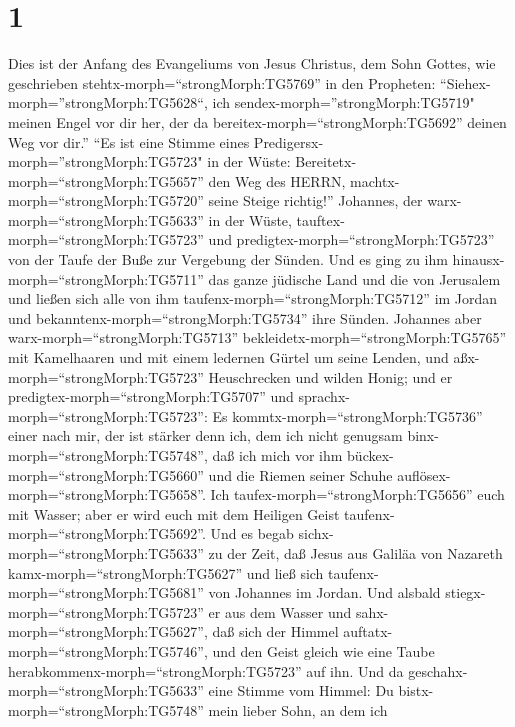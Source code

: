 \hypertarget{section}{%
\section{1}\label{section}}

 Dies ist der Anfang des Evangeliums von Jesus Christus, dem
Sohn Gottes,  wie geschrieben
stehtx-morph=``strongMorph:TG5769'' in den Propheten:
``Siehex-morph=''strongMorph:TG5628``, ich
sendex-morph=''strongMorph:TG5719" meinen Engel vor dir her, der da
bereitex-morph=``strongMorph:TG5692'' deinen Weg vor dir.'' 
``Es ist eine Stimme eines Predigersx-morph=''strongMorph:TG5723" in der
Wüste: Bereitetx-morph=``strongMorph:TG5657'' den Weg des HERRN,
machtx-morph=``strongMorph:TG5720'' seine Steige richtig!'' 
Johannes, der warx-morph=``strongMorph:TG5633'' in der Wüste,
tauftex-morph=``strongMorph:TG5723'' und
predigtex-morph=``strongMorph:TG5723'' von der Taufe der Buße zur
Vergebung der Sünden.  Und es ging zu ihm
hinausx-morph=``strongMorph:TG5711'' das ganze jüdische Land und die von
Jerusalem und ließen sich alle von ihm
taufenx-morph=``strongMorph:TG5712'' im Jordan und
bekanntenx-morph=``strongMorph:TG5734'' ihre Sünden. 
Johannes aber warx-morph=``strongMorph:TG5713''
bekleidetx-morph=``strongMorph:TG5765'' mit Kamelhaaren und mit einem
ledernen Gürtel um seine Lenden, und aßx-morph=``strongMorph:TG5723''
Heuschrecken und wilden Honig;  und er
predigtex-morph=``strongMorph:TG5707'' und
sprachx-morph=``strongMorph:TG5723'': Es
kommtx-morph=``strongMorph:TG5736'' einer nach mir, der ist stärker denn
ich, dem ich nicht genugsam binx-morph=``strongMorph:TG5748'', daß ich
mich vor ihm bückex-morph=``strongMorph:TG5660'' und die Riemen seiner
Schuhe auflösex-morph=``strongMorph:TG5658''.  Ich
taufex-morph=``strongMorph:TG5656'' euch mit Wasser; aber er wird euch
mit dem Heiligen Geist taufenx-morph=``strongMorph:TG5692''.
 Und es begab sichx-morph=``strongMorph:TG5633'' zu der
Zeit, daß Jesus aus Galiläa von Nazareth
kamx-morph=``strongMorph:TG5627'' und ließ sich
taufenx-morph=``strongMorph:TG5681'' von Johannes im Jordan.
 Und alsbald stiegx-morph=``strongMorph:TG5723'' er aus dem
Wasser und sahx-morph=``strongMorph:TG5627'', daß sich der Himmel
auftatx-morph=``strongMorph:TG5746'', und den Geist gleich wie eine
Taube herabkommenx-morph=``strongMorph:TG5723'' auf ihn. 
Und da geschahx-morph=``strongMorph:TG5633'' eine Stimme vom Himmel: Du
bistx-morph=``strongMorph:TG5748'' mein lieber Sohn, an dem ich

